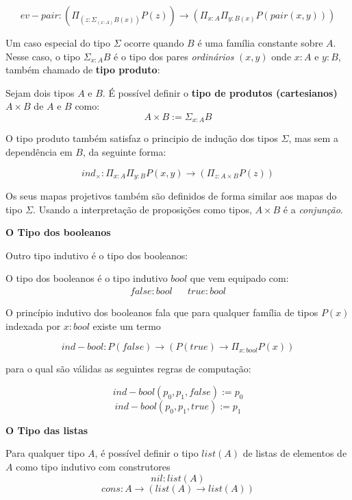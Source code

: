 \documentclass[../main.tex]{subfiles}
\begin{document}
$$ev-pair : (\Pi_{(z : \Sigma_{(x : A)}B(x))} P(z)) \to (\Pi_{x : A}\Pi_{y : B(x)}P(pair(x, y)))$$

Um caso especial do tipo $\Sigma$ ocorre quando $B$ é uma família constante sobre $A$. Nesse caso, o tipo $\Sigma_{x : A} B$ é o tipo dos pares \emph{ordinários} $(x, y)$ onde $x : A$ e $y : B$, também chamado de \textbf{tipo produto}:

\begin{definition}
    Sejam dois tipos $A$ e $B$. É possível definir o \textbf{tipo de produtos (cartesianos)} $A \times B$ de $A$ e $B$ como:
    $$A \times B := \Sigma_{x : A} B$$
\end{definition}

O tipo produto também satisfaz o principio de indução dos tipos $\Sigma$, mas sem a dependência em $B$, da seguinte forma:

$$ind_{\times} : \Pi_{x : A}\Pi_{y : B}P(x, y) \to (\Pi_{z : A \times B} P(z))$$

Os seus mapas projetivos também são definidos de forma similar aos mapas do tipo $\Sigma$. Usando a interpretação de proposições como tipos, $A \times B$ é a \emph{conjunção}.

\textbf{O Tipo dos booleanos}

Outro tipo indutivo é o tipo dos booleanos:

\begin{definition}
    O tipo dos booleanos é o tipo indutivo $bool$ que vem equipado com:
    \begin{align}
        false : bool && true : bool
    \end{align}
\end{definition}

O princípio indutivo dos booleanos fala que para qualquer família de tipos $P(x)$ indexada por $x : bool$ existe um termo

$$ind-bool : P(false) \to (P(true) \to \Pi_{x : bool} P(x))$$

para o qual são válidas as seguintes regras de computação:

$$ind-bool(p_0, p_1, false) := p_0$$
$$ind-bool(p_0, p_1, true) := p_1$$

\textbf{O Tipo das listas}

\begin{definition}
    Para qualquer tipo $A$, é possível definir o tipo $list(A)$ de listas de elementos de $A$ como tipo indutivo com construtores
    $$nil : list(A)$$
    $$cons : A \to (list(A) \to list(A))$$
\end{definition}
\end{document}
